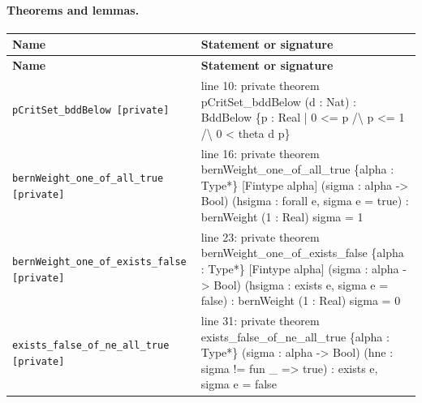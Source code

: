 \documentclass[10pt]{article}
\begin{document}
\paragraph{Theorems and lemmas.}
\begin{longtable}{>{\raggedright\arraybackslash}p{} >{\raggedright\arraybackslash}p{}}
\textbf{Name} & \textbf{Statement or signature} \\
\hline
\endfirsthead
\textbf{Name} & \textbf{Statement or signature} \\
\hline
\endhead
\texttt{pCritSet\_\allowbreak{}bddBelow [private]} & {\ttfamily\scriptsize line 10:\allowbreak{} private theorem pCritSet\_\allowbreak{}bddBelow (\allowbreak{}d :\allowbreak{} Nat)\allowbreak{} :\allowbreak{} BddBelow \{p :\allowbreak{} Real | 0 <=\allowbreak{} p /\allowbreak{}\textbackslash{} p <=\allowbreak{} 1 /\allowbreak{}\textbackslash{} 0 < theta d p\}} \\[0.45em]
\texttt{bernWeight\_\allowbreak{}one\_\allowbreak{}of\_\allowbreak{}all\_\allowbreak{}true [private]} & {\ttfamily\scriptsize line 16:\allowbreak{} private theorem bernWeight\_\allowbreak{}one\_\allowbreak{}of\_\allowbreak{}all\_\allowbreak{}true \{alpha :\allowbreak{} Type*\allowbreak{}\} [Fintype alpha] (\allowbreak{}sigma :\allowbreak{} alpha -\allowbreak{}> Bool)\allowbreak{} (\allowbreak{}hsigma :\allowbreak{} forall e,\allowbreak{} sigma e =\allowbreak{} true)\allowbreak{} :\allowbreak{} bernWeight (\allowbreak{}1 :\allowbreak{} Real)\allowbreak{} sigma =\allowbreak{} 1} \\[0.45em]
\texttt{bernWeight\_\allowbreak{}one\_\allowbreak{}of\_\allowbreak{}exists\_\allowbreak{}false [private]} & {\ttfamily\scriptsize line 23:\allowbreak{} private theorem bernWeight\_\allowbreak{}one\_\allowbreak{}of\_\allowbreak{}exists\_\allowbreak{}false \{alpha :\allowbreak{} Type*\allowbreak{}\} [Fintype alpha] (\allowbreak{}sigma :\allowbreak{} alpha -\allowbreak{}> Bool)\allowbreak{} (\allowbreak{}hsigma :\allowbreak{} exists e,\allowbreak{} sigma e =\allowbreak{} false)\allowbreak{} :\allowbreak{} bernWeight (\allowbreak{}1 :\allowbreak{} Real)\allowbreak{} sigma =\allowbreak{} 0} \\[0.45em]
\texttt{exists\_\allowbreak{}false\_\allowbreak{}of\_\allowbreak{}ne\_\allowbreak{}all\_\allowbreak{}true [private]} & {\ttfamily\scriptsize line 31:\allowbreak{} private theorem exists\_\allowbreak{}false\_\allowbreak{}of\_\allowbreak{}ne\_\allowbreak{}all\_\allowbreak{}true \{alpha :\allowbreak{} Type*\allowbreak{}\} (\allowbreak{}sigma :\allowbreak{} alpha -\allowbreak{}> Bool)\allowbreak{} (\allowbreak{}hne :\allowbreak{} sigma !=\allowbreak{} fun \_\allowbreak{} =\allowbreak{}> true)\allowbreak{} :\allowbreak{} exists e,\allowbreak{} sigma e =\allowbreak{} false} \\[0.45em]

\end{longtable}
\end{document}
